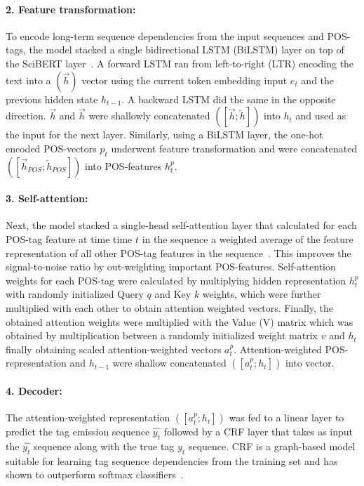 \documentclass[letterpaper]{article} %
\begin{document}
\paragraph{2. Feature transformation:}
%
To encode long-term sequence dependencies from the input sequences and POS-tags, the model stacked a single bidirectional LSTM (BiLSTM) layer on top of the SciBERT layer~\cite{hochreiter1997long}.
A forward LSTM ran from left-to-right (LTR) encoding the text into a $(\overrightarrow{h})$ vector using the current token embedding input $e_{t}$ and the previous hidden state $h_{t-1}$.
A backward LSTM did the same in the opposite direction.
$\overrightarrow{h}$ and $\overrightarrow{h}$ were shallowly concatenated $([\overrightarrow{h}; \overleftarrow{h}])$ into $h_{t}$ and used as the input for the next layer.
Similarly, using a BiLSTM layer, the one-hot encoded POS-vectors $p_{t}$ underwent feature transformation and were concatenated $([\overrightarrow{h}_{POS}; \overleftarrow{h}_{POS}])$ into POS-features $h^{p}_{t}$.
%
\paragraph{3. Self-attention: }
%
Next, the model stacked a single-head self-attention layer that calculated for each POS-tag feature at time time $t$ in the sequence a weighted average of the feature representation of all other POS-tag features in the sequence~\cite{vaswani2017attention}.
This improves the signal-to-noise ratio by out-weighting important POS-features.
Self-attention weights for each POS-tag were calculated by multiplying hidden representation $h^{p}_{t}$ with randomly initialized Query $q$ and Key $k$ weights, which were further multiplied with each other to obtain attention weighted vectors.
Finally, the obtained attention weights were multiplied with the Value (V) matrix which was obtained by multiplication between a randomly initialized weight matrix $v$ and $h_{t}$ finally obtaining scaled attention-weighted vectors $a^{p}_{t}$.
Attention-weighted POS-representation and $h_{t-1}$ were shallow concatenated $([a^{p}_{t}; h_{t}])$ into vector.
%
\paragraph{4. Decoder:}
%
The attention-weighted representation $([a^{p}_{t}; h_{t}])$ was fed to a linear layer to predict the tag emission sequence $\hat{y_{t}}$ followed by a CRF layer that takes as input the $\hat{y_{t}}$ sequence along with the true tag $y_{t}$ sequence.
CRF is a graph-based model suitable for learning tag sequence dependencies from the training set and has shown to outperform softmax classifiers~\cite{huang2015bidirectional}.
%
%
%
\end{document}
